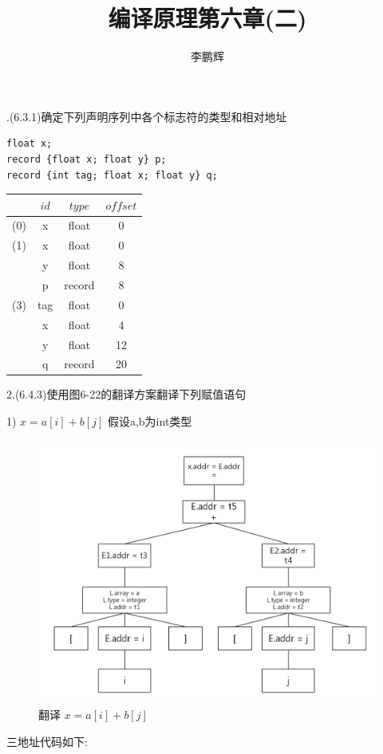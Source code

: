 \documentclass[a4paper, 16pt]{article}
\title{编译原理第六章(二)}
\author{李鹏辉}
\begin{document}
.(6.3.1)确定下列声明序列中各个标志符的类型和相对地址
\lstset{language=C}
\begin{lstlisting}
float x;
record {float x; float y} p;
record {int tag; float x; float y} q;
\end{lstlisting}

\begin{table}[H]
\centering
\begin{tabular}{c|c|c|c}
\hline
\hline
  &$id$& $type$ & $offset$ \\
\hline
(0) & x & float & 0  \\
\hline
(1) & x & float & 0  \\
    & y & float & 8 \\
    & p & record & 8 \\
\hline 
 (3)& tag& float & 0 \\
    & x & float & 4 \\
    & y & float &12 \\
    & q & record& 20 \\
\hline
\end{tabular}
\end{table}



2.(6.4.3)使用图6-22的翻译方案翻译下列赋值语句

1) $x = a[i] + b[j]$
假设a,b为int类型
\begin{figure}[H]
\centering
\includegraphics[scale=0.3]{chapter6_hw2_1}
\caption{翻译 $x = a[i] + b[j]$}
\end{figure}
三地址代码如下:
\end{document}
